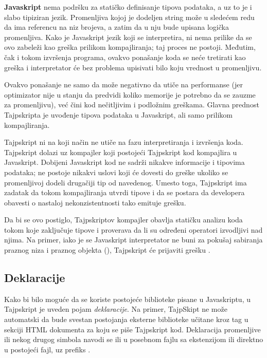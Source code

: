 \textbf{Javaskript} nema podršku za statičko definisanje tipova podataka, a uz to je i slabo tipiziran jezik.
Promenljiva kojoj je dodeljen string može u sledećem redu da ima referencu na niz brojeva, a zatim da u nju bude upisana logička promenljiva.
Kako je Javaskript jezik koji se interpretira, ni nema prilike da se ovo zabeleži kao greška prilikom kompajliranja; taj proces ne postoji.
Međutim, čak i tokom izvršenja programa, ovakvo ponašanje koda se neće tretirati kao greška i interpretator će bez problema upisivati bilo koju vrednost u promenljivu.

Ovakvo ponašanje ne samo da može negativno da utiče na performanse (jer optimizator nije u stanju da predvidi koliko memorije je potrebno da se zauzme za promenljivu), već čini kod nečitljivim i podložnim greškama.
Glavna prednost Tajpskripta je uvođenje tipova podataka u Javaskript, ali samo prilikom kompajliranja.

Tajpskript ni na koji način ne utiče na fazu interpretiranja i izvršenja koda.
Tajpskript dolazi uz kompajler koji postojeći Tajpskript kod kompajlira u Javaskript.
Dobijeni Javaskript kod ne sadrži nikakve informacije i tipovima podataka; ne postoje nikakvi uslovi koji će dovesti do greške ukoliko se promenljivoj dodeli drugačiji tip od navedenog.
Umesto toga, Tajpskript ima zadatak da tokom kompajliranja utvrdi tipove i da se postara da developera obavesti o nastaloj nekonzistentnosti tako emituje grešku.

Da bi se ovo postiglo, Tajpskriptov kompajler obavlja statičku analizu koda tokom koje zaključuje tipove i proverava da li su određeni operatori izvodljivi nad njima.
Na primer, iako je se Javaskript interpretator ne buni za pokušaj sabiranja praznog niza i praznog objekta (\code{[] + \{\}}), Tajpskript će prijaviti grešku .

\subsection{Deklaracije}

Kako bi bilo moguće da se koriste postojeće biblioteke pisane u Javaskriptu, u Tajpskript je uveden pojam \textit{deklaracije}.
Na primer, TajpSkipt ne može automatski da bude svestan postojanja eksterne biblioteke učitane kroz  tag u  sekciji HTML dokumenta za koju se piše Tajpskript kod.
Deklaracija promenljive ili nekog drugog simbola navodi se ili u posebnom fajlu sa ekstenzijom  ili direktno u postojeći fajl, uz prefiks .


